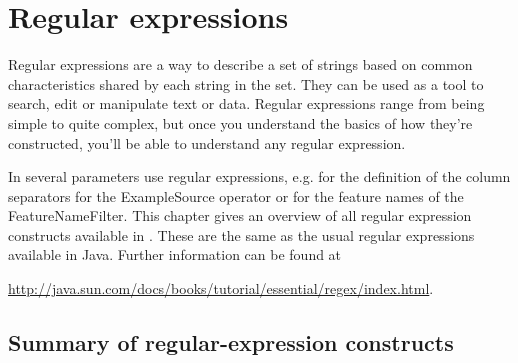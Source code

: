 \chapter{Regular expressions}
\label{sec:regular_expressions}

Regular expressions are a way to describe a set of strings based on common
characteristics shared by each string in the set. They can be used as a tool
to search, edit or manipulate text or data. Regular expressions range from
being simple to quite complex, but once you understand the basics of how
they're constructed, you'll be able to understand any regular expression.

In \rapidminer several parameters use regular expressions, e.g. for the definition
of the column separators for the ExampleSource operator or for the feature
names of the FeatureNameFilter. This chapter gives an
overview of all regular expression constructs available in \rapidminer. These are
the same as the usual regular expressions available in Java. Further
information can be found at
\begin{center}
\url{http://java.sun.com/docs/books/tutorial/essential/regex/index.html}.
\end{center}



\section{Summary of regular-expression constructs}


